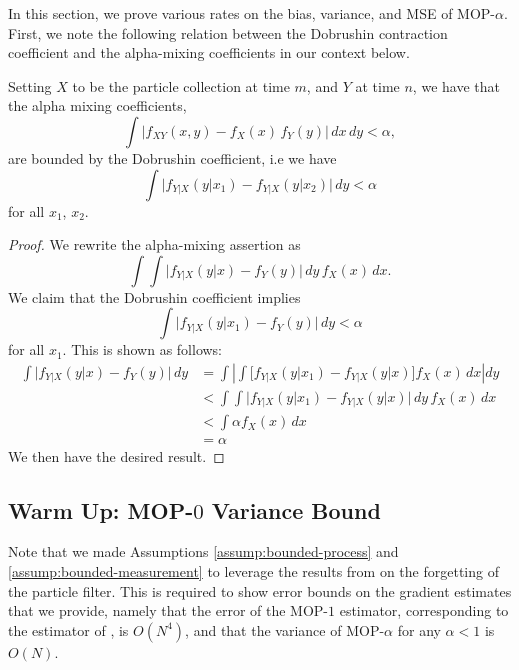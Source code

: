 

In this section, we prove various rates on the bias, variance, and MSE of MOP-$\alpha$. 
First, we note the following relation between the Dobrushin contraction coefficient and the alpha-mixing coefficients in our context below.
\begin{lem}
    \label{lem:dobrushin-implies-alpha-mixing}
    Setting $X$ to be the particle collection at time $m$, and $Y$ at time $n$, we have that the alpha mixing coefficients,
    \begin{equation}
    \int \big| f_{XY}(x,y) - f_X (x)\, f_Y(y) \big|\, dx\, dy < \alpha,
    \end{equation}
    are bounded by the Dobrushin coefficient, i.e we have
    \begin{equation}
    \int \big| f_{Y|X}(y|x_1) - f_{Y|X}(y|x_2) \big| \, dy < \alpha
    \end{equation} 
    for all $x_1$, $x_2$.
\end{lem}

\begin{proof}
    We rewrite the alpha-mixing assertion as 
    \begin{equation}
    \int { \int \big|f_{Y|X}(y|x) - f_Y(y)\big| \, dy } \, f_X(x) \, dx.
    \end{equation}
    We claim that the Dobrushin coefficient implies 
    \begin{equation}
    \int \big| f_{Y|X}(y|x_1) - f_Y(y) \big| \, dy < \alpha
    \end{equation} 
    for all $x_1$. This is shown as follows:
    \begin{align}
        \int \big| f_{Y|X}(y|x) - f_Y(y) \big| \, dy 
        &= \int \left|  \int \big[f_{Y|X}(y|x_1) - f_{Y|X}(y|x)\big] f_X(x) \, dx \right|dy \\
        &< \int   \int  \big| f_{Y|X}(y|x_1) - f_{Y|X}(y|x)\big| \, dy \, f_X(x)\, dx \\
        &< \int \alpha f_X(x) \, dx \\
        &=\alpha
    \end{align}
    We then have the desired result.
\end{proof}

\subsection{Warm Up: MOP-$0$ Variance Bound}

Note that we made Assumptions \ref{assump:bounded-process} and \ref{assump:bounded-measurement} to leverage the results from \cite{karjalainen23} on the forgetting of the particle filter. 
This is required to show error bounds on the gradient estimates that we provide, namely that the error of the MOP-$1$ estimator, corresponding to the estimator of \cite{poyiadjis11}, is $O(N^4)$, and that the variance of MOP-$\alpha$ for any $\alpha<1$ is $O(N)$. 

